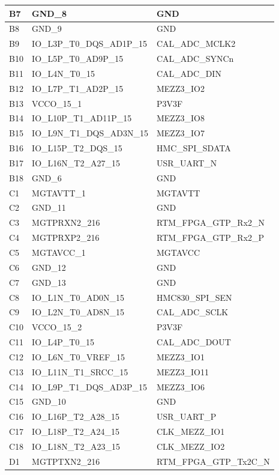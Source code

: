 \begin{footnotesize}
\begin{longtable}{|l|p{6cm}|p{6cm}|}
B7	&	GND\_8	&	GND	\\ \hline
B8	&	GND\_9	&	GND	\\ \hline
B9	&	IO\_L3P\_T0\_DQS\_AD1P\_15	&	CAL\_ADC\_MCLK2	\\ \hline
B10	&	IO\_L5P\_T0\_AD9P\_15	&	CAL\_ADC\_SYNCn	\\ \hline
B11	&	IO\_L4N\_T0\_15	&	CAL\_ADC\_DIN	\\ \hline
B12	&	IO\_L7P\_T1\_AD2P\_15	&	MEZZ3\_IO2	\\ \hline
B13	&	VCCO\_15\_1	&	P3V3F	\\ \hline
B14	&	IO\_L10P\_T1\_AD11P\_15	&	MEZZ3\_IO8	\\ \hline
B15	&	IO\_L9N\_T1\_DQS\_AD3N\_15	&	MEZZ3\_IO7	\\ \hline
B16	&	IO\_L15P\_T2\_DQS\_15	&	HMC\_SPI\_SDATA	\\ \hline
B17	&	IO\_L16N\_T2\_A27\_15	&	USR\_UART\_N	\\ \hline
B18	&	GND\_6	&	GND	\\ \hline
C1	&	MGTAVTT\_1	&	MGTAVTT	\\ \hline
C2	&	GND\_11	&	GND	\\ \hline
C3	&	MGTPRXN2\_216	&	RTM\_FPGA\_GTP\_Rx2\_N	\\ \hline
C4	&	MGTPRXP2\_216	&	RTM\_FPGA\_GTP\_Rx2\_P	\\ \hline
C5	&	MGTAVCC\_1	&	MGTAVCC	\\ \hline
C6	&	GND\_12	&	GND	\\ \hline
C7	&	GND\_13	&	GND	\\ \hline
C8	&	IO\_L1N\_T0\_AD0N\_15	&	HMC830\_SPI\_SEN	\\ \hline
C9	&	IO\_L2N\_T0\_AD8N\_15	&	CAL\_ADC\_SCLK	\\ \hline
C10	&	VCCO\_15\_2	&	P3V3F	\\ \hline
C11	&	IO\_L4P\_T0\_15	&	CAL\_ADC\_DOUT	\\ \hline
C12	&	IO\_L6N\_T0\_VREF\_15	&	MEZZ3\_IO1	\\ \hline
C13	&	IO\_L11N\_T1\_SRCC\_15	&	MEZZ3\_IO11	\\ \hline
C14	&	IO\_L9P\_T1\_DQS\_AD3P\_15	&	MEZZ3\_IO6	\\ \hline
C15	&	GND\_10	&	GND	\\ \hline
C16	&	IO\_L16P\_T2\_A28\_15	&	USR\_UART\_P	\\ \hline
C17	&	IO\_L18P\_T2\_A24\_15	&	CLK\_MEZZ\_IO1	\\ \hline
C18	&	IO\_L18N\_T2\_A23\_15	&	CLK\_MEZZ\_IO2	\\ \hline
D1	&	MGTPTXN2\_216	&	RTM\_FPGA\_GTP\_Tx2C\_N	\\ \hline

\end{longtable}
\end{footnotesize}

